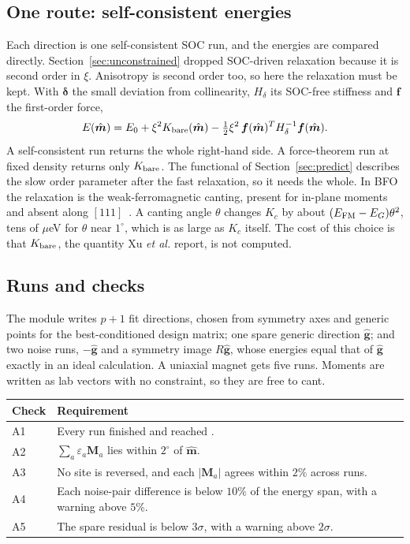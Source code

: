 \documentclass[11pt,a4paper]{article}
\numberwithin{equation}{section}
\newcommand{\vct}[1]{\bm{#1}}
\newcommand{\code}[1]{\texttt{\detokenize{#1}}}
\begin{document}
\subsection{One route: self-consistent energies}\label{sec:mcaroute}

Each direction is one self-consistent SOC run, and the energies are compared
directly. Section~\ref{sec:unconstrained} dropped SOC-driven relaxation because
it is second order in $\xi$. Anisotropy is second order too, so here the
relaxation must be kept. With $\vct\delta$ the small deviation from collinearity,
$H_\delta$ its SOC-free stiffness and $\vct f$ the first-order force,
\begin{equation}\label{eq:keff}
 E(\hat{\vct m})=E_0+\xi^2K_{\rm bare}(\hat{\vct m})
 -\tfrac12\xi^2\,\vct f(\hat{\vct m})^TH_\delta^{-1}\vct f(\hat{\vct m}).
\end{equation}
A self-consistent run returns the whole right-hand side. A force-theorem run
at fixed density returns only $K_{\rm bare}$. The functional of
Section~\ref{sec:predict} describes the slow order parameter after the fast
relaxation, so it needs the whole. In BFO the relaxation is the
weak-ferromagnetic canting, present for in-plane moments and absent along
$[111]$~\cite{ederer}. A canting angle $\theta$ changes $K_c$ by about
$(E_{\rm FM}-E_G)\theta^2$, tens of $\mu$eV for $\theta$ near $1^\circ$, which is
as large as $K_c$ itself. The cost of this choice is that $K_{\rm bare}$, the
quantity Xu \emph{et al.} report, is not computed.

\subsection{Runs and checks}

The module writes $p+1$ fit directions, chosen from symmetry axes and generic
points for the best-conditioned design matrix; one spare generic direction
$\hat{\vct g}$; and two noise runs, $-\hat{\vct g}$ and a symmetry image
$R\hat{\vct g}$, whose energies equal that of $\hat{\vct g}$ exactly in an ideal
calculation. A uniaxial magnet gets five runs. Moments are written as lab
vectors with no constraint, so they are free to cant.

\begin{center}
\begin{tabularx}{\textwidth}{@{}lY@{}}
\toprule Check & Requirement\\\midrule
A1 & Every run finished and reached \code{EDIFF}.\\
A2 & $\sum_a\varepsilon_a\vct M_a$ lies within $2^\circ$ of $\hat{\vct m}$.\\
A3 & No site is reversed, and each $|\vct M_a|$ agrees within $2\%$ across runs.\\
A4 & Each noise-pair difference is below $10\%$ of the energy span, with a warning above $5\%$.\\
A5 & The spare residual is below $3\sigma$, with a warning above $2\sigma$.\\
\bottomrule
\end{tabularx}
\end{center}
\end{document}
